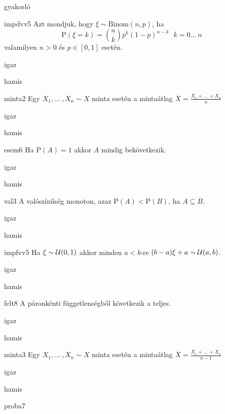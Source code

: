 \documentclass[12pt]{article}
\begin{document}
\begin{quiz}{gyakorló}
\begin{multi}[feedback={Def.}]{impdvv5}
Azt mondjuk, hogy $\xi\sim \mathrm{Binom}(n,p)$, ha 
$$
\mathrm{P}(\xi=k)=\binom{n}{k}p^k(1-p)^{n-k}\ \ \ k=0{...\:} n
$$
valamilyen $n>0$ és $p\in[0,1]$ esetén.
\item* igaz
\item hamis
\end{multi}
\begin{multi}[feedback={Definíció}]{minta2}
Egy $X_1,{...\:},X_n\sim X$ minta esetén a mintaátlag $\overline{X}=\frac{X_1+{...\:}+X_n}{n}$
\item* igaz
\item hamis
\end{multi}
\begin{multi}[feedback={Például: legyen a kísérlet random húzás a $[0,1]$-ből és $A=\{x\in [0,1]:x\neq \frac{1}{2}\}$}]{esem6}
Ha $\mathrm{P}(A)=1$ akkor $A$ mindig bekövetkezik.
\item igaz
\item* hamis
\end{multi}
\begin{multi}[feedback={$A=B$?}]{val3}
A valószínűség monoton, azaz $\mathrm{P}(A)<\mathrm{P}(B)$, ha $A\subseteq B$.
\item igaz
\item* hamis
\end{multi}
\begin{multi}[feedback={Egyenletes lineáris transzformáltja is egyenletes (a konstans elfajult esettől eltekintve)}]{impfvv5}
Ha $\xi\sim {\cal U}(0,1)$ akkor minden $a<b$-re $(b-a)\xi+a\sim {\cal U}(a,b)$.
\item* igaz
\item hamis
\end{multi}
\begin{multi}[feedback={A páronkénti gyengébb tulajdonság.}]{felt8}
A páronkénti függetlenségből következik a teljes.
\item igaz
\item* hamis
\end{multi}
\begin{multi}[feedback={Definíció}]{minta3}
Egy $X_1,{...\:},X_n\sim X$ minta esetén a mintaátlag $\overline{X}=\frac{X_1+{...\:}+X_n}{n-1}$
\item igaz
\item* hamis
\end{multi}
\begin{multi}[feedback={A fenti formula az $t$-próba ún. próbastatisztikája.}]{proba7}

\end{multi}
\end{quiz}
\end{document}
